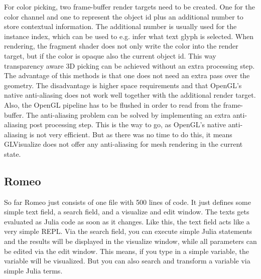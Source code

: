 For color picking, two frame-buffer render targets need to be created. 
One for the color channel and one to represent the object id plus an additional number to store contextual information. The additional number is usually used for the instance index, which can be used to e.g. infer what text glyph is selected.
When rendering, the fragment shader does not only write the color into the render target, but if the color is opaque also the current object id.
This way transparency aware 3D picking can be achieved without an extra processing step. 
The advantage of this methods is that one does not need an extra pass over the geometry. The disadvantage is higher space requirements and that OpenGL's native anti-aliasing does not work well together with the additional render target. Also, the OpenGL pipeline has to be flushed in order to read from the frame-buffer.
The anti-aliasing problem can be solved by implementing an extra anti-aliasing post processing step. This is the way to go, as OpenGL's native anti-aliasing is not very efficient. 
But as there was no time to do this, it means GLVisualize does not offer any anti-aliasing for mesh rendering in the current state.


\subsection{Romeo}

So far Romeo just consists of one file with 500 lines of code. It just defines some simple text field, a search field, and a visualize and edit window.
The texts gets evaluated as Julia code as soon as it changes. Like this, the text field acts like a very simple \ac{REPL}.
Via the search field, you can execute simple Julia statements and the results will be displayed in the visualize window, while all parameters can be edited via the edit window.
This means, if you type in a simple variable, the variable will be visualized. But you can also search and transform a variable via simple Julia terms.